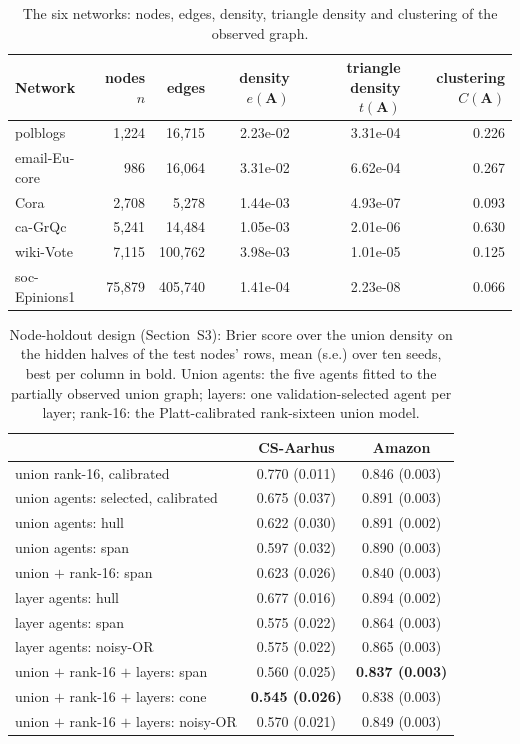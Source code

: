 \documentclass[12pt]{article}
\begin{document}
\begin{table}[t]
\centering
\caption{The six networks: nodes, edges, density, triangle density and clustering of the observed graph.}
\small
\begin{tabular}{lrrrrr}
\toprule
Network & nodes $n$ & edges & density $e(\mathbf{A})$ & triangle density $t(\mathbf{A})$ & clustering $C(\mathbf{A})$ \\
\midrule
polblogs & 1,224 & 16,715 & 2.23e-02 & 3.31e-04 & 0.226 \\
email-Eu-core & 986 & 16,064 & 3.31e-02 & 6.62e-04 & 0.267 \\
Cora & 2,708 & 5,278 & 1.44e-03 & 4.93e-07 & 0.093 \\
ca-GrQc & 5,241 & 14,484 & 1.05e-03 & 2.01e-06 & 0.630 \\
wiki-Vote & 7,115 & 100,762 & 3.98e-03 & 1.01e-05 & 0.125 \\
soc-Epinions1 & 75,879 & 405,740 & 1.41e-04 & 2.23e-08 & 0.066 \\
\bottomrule
\end{tabular}

\end{table}

\begin{table}[t]
\centering
\caption{Node-holdout design (Section~S3): Brier score over the union density on the hidden halves of the test nodes' rows, mean (s.e.) over ten seeds, best per column in bold. Union agents: the five agents fitted to the partially observed union graph; layers: one validation-selected agent per layer; rank-16: the Platt-calibrated rank-sixteen union model.}
\label{tab:nodeholdout}
\small
\begin{tabular}{lcc}
\toprule
 & CS-Aarhus & Amazon \\
\midrule
union rank-16, calibrated & 0.770 (0.011) & 0.846 (0.003) \\
union agents: selected, calibrated & 0.675 (0.037) & 0.891 (0.003) \\
union agents: hull & 0.622 (0.030) & 0.891 (0.002) \\
union agents: span & 0.597 (0.032) & 0.890 (0.003) \\
union $+$ rank-16: span & 0.623 (0.026) & 0.840 (0.003) \\
layer agents: hull & 0.677 (0.016) & 0.894 (0.002) \\
layer agents: span & 0.575 (0.022) & 0.864 (0.003) \\
layer agents: noisy-OR & 0.575 (0.022) & 0.865 (0.003) \\
union $+$ rank-16 $+$ layers: span & 0.560 (0.025) & \textbf{0.837 (0.003)} \\
union $+$ rank-16 $+$ layers: cone & \textbf{0.545 (0.026)} & 0.838 (0.003) \\
union $+$ rank-16 $+$ layers: noisy-OR & 0.570 (0.021) & 0.849 (0.003) \\
\bottomrule
\end{tabular}

\end{table}
\end{document}

